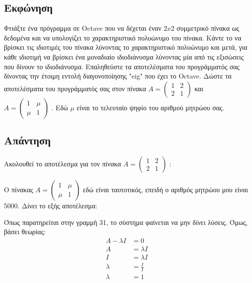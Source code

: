 \documentclass[a4paper,12pt]{article}
\begin{document}
\subsection{Εκφώνηση}
\begin{center}
    Φτιάξτε ένα πρόγραμμα σε Octave που να δέχεται έναν ${2x2}$ συμμετρικό πίνακα ως δεδομένα και να
    υπολογίζει το χαρακτηριστικό πολυώνυμο του πίνακα. Κάντε το να βρίσκει τις ιδιοτιμές του πίνακα
    λύνοντας το χαρακτηριστικό πολυώνυμο και μετά, για κάθε ιδιοτιμή να βρίσκει ένα μοναδιαίο ιδιοδιάνυσμα
    λύνοντας μία από τις εξισώσεις που δίνουν το ιδιοδιάνυσμα. Επαληθεύστε τα αποτελέσματα του προγράμματός
    σας δίνοντας την έτοιμη εντολή διαγονοποίησης "eig" που έχει το Octave. Δώστε τα αποτελέσματα του
    προγράμματός σας στον πίνακα
    $
        A=\begin{pmatrix}
            1 & 2 \\
            2 & 1
        \end{pmatrix}
    $
    και
    $
        A=\begin{pmatrix}
            1   & \mu \\
            \mu & 1
        \end{pmatrix}
    $
    . Εδώ ${\mu}$ είναι το τελευταίο ψηφίο του αριθμού μητρώου σας.
\end{center}
\newpage\subsection{Απάντηση}
Ακολουθεί το αποτέλεσμα για τον πίνακα
$
    A=\begin{pmatrix}
        1 & 2 \\
        2 & 1
    \end{pmatrix}
$
:

Ο πίνακας
$
    A=\begin{pmatrix}
        1   & \mu \\
        \mu & 1
    \end{pmatrix}
$
εδώ είναι ταυτοτικός, επειδή ο αριθμός μητρώου μου είναι 5000. Δίνει το εξής αποτέλεσμα:

Όπως παρατηρείται στην γραμμή 31, το σύστημα φαίνεται να μην δίνει λύσεις. Όμως, βάσει θεωρίας:
\begin{equation}
    \begin{split}
        A - \lambda I &= 0 \\
        A &= \lambda I \\
        I &= \lambda I \\
        \lambda & =\frac{I}{I} \\
        \lambda & =1
    \end{split}
\end{equation}
\end{document}
